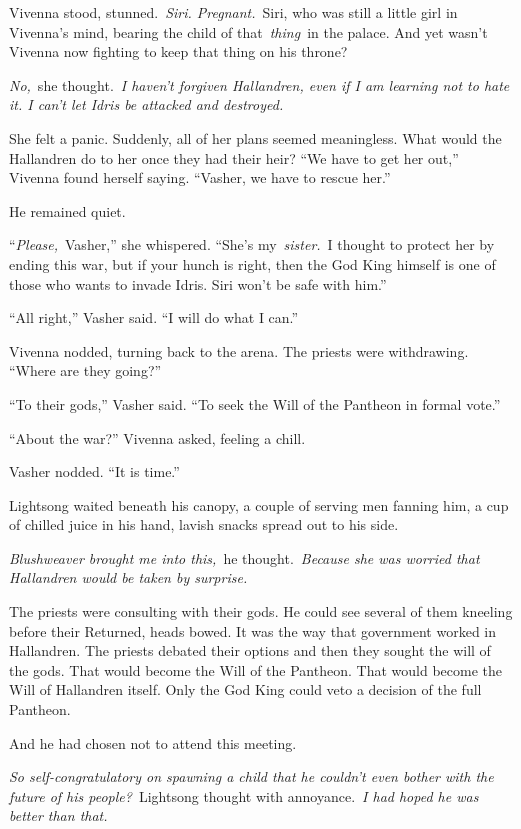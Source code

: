 Vivenna stood, stunned.~\textit{Siri. Pregnant.}~Siri, who was still a little girl in Vivenna’s mind, bearing the child of that~\textit{thing}~in the palace. And yet wasn’t Vivenna now fighting to keep that thing on his throne?

\textit{No,}~she thought.~\textit{I haven’t forgiven Hallandren, even if I am learning not to hate it. I can’t let Idris be attacked and destroyed.}

She felt a panic. Suddenly, all of her plans seemed meaningless. What would the Hallandren do to her once they had their heir? “We have to get her out,” Vivenna found herself saying. “Vasher, we have to rescue her.”

He remained quiet.

“\textit{Please,}~Vasher,” she whispered. “She’s my~\textit{sister.}~I thought to protect her by ending this war, but if your hunch is right, then the God King himself is one of those who wants to invade Idris. Siri won’t be safe with him.”

“All right,” Vasher said. “I will do what I can.”

Vivenna nodded, turning back to the arena. The priests were withdrawing. “Where are they going?”

“To their gods,” Vasher said. “To seek the Will of the Pantheon in formal vote.”

“About the war?” Vivenna asked, feeling a chill.

Vasher nodded. “It is time.”

\orn

Lightsong waited beneath his canopy, a couple of serving men fanning him, a cup of chilled juice in his hand, lavish snacks spread out to his side.

\textit{Blushweaver brought me into this,}~he thought.~\textit{Because she was worried that Hallandren would be taken by surprise.}

The priests were consulting with their gods. He could see several of them kneeling before their Returned, heads bowed. It was the way that government worked in Hallandren. The priests debated their options and then they sought the will of the gods. That would become the Will of the Pantheon. That would become the Will of Hallandren itself. Only the God King could veto a decision of the full Pantheon.

And he had chosen not to attend this meeting.

\textit{So self-congratulatory on spawning a child that he couldn’t even bother with the future of his people?}~Lightsong thought with annoyance.~\textit{I had hoped he was better than that.}

